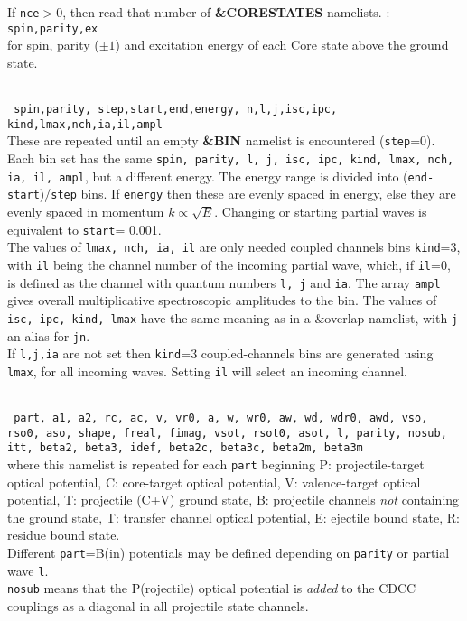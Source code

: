 \documentclass[11pt]{article}
\begin{document}
If {\tt nce}$>$0, then read that number of {\bf
\&CORESTATES} namelists. : {\tt
spin,parity,ex }\\ for spin, parity ($\pm1$) and excitation energy of each Core
state above the ground state.

\\
{\tt
spin,parity, step,start,end,energy, n,l,j,isc,ipc, kind,lmax,nch,ia,il,ampl
}\\
These are repeated until an empty  {\bf \&BIN} namelist is encountered
({\tt step}=0).\\
Each bin set has the same {\tt spin, parity, l, j, isc, ipc, kind, lmax, nch, ia,
il, ampl}, but a different energy.
The energy range is divided into ({\tt end-start})/{\tt step} bins.
If {\tt energy} then these are evenly spaced in energy, else they
are evenly spaced in momentum $k \propto \sqrt{E}$.
Changing or starting partial waves is equivalent to {\tt start}= 0.001.
\\
The values of {\tt lmax, nch, ia, il} are only needed coupled channels bins
{\tt kind}=3, with {\tt il} being the channel number of the incoming partial wave,
which, if {\tt il}=0, is defined as the channel with quantum numbers
{\tt l, j} and {\tt ia}. The array {\tt ampl} gives overall multiplicative
spectroscopic amplitudes to the bin. The values of {\tt isc, ipc, kind, lmax}
have the same meaning as in a \&overlap namelist, with {\tt j} an alias for {\tt jn}.\\
If {\tt l,j,ia} are not set then {\tt kind}=3 coupled-channels bins are generated
using {\tt lmax}, for all incoming waves. Setting {\tt il} will select an
incoming channel.

\\
{\tt
part, a1, a2, rc, ac, v, vr0, a, w, wr0, aw,
wd, wdr0, awd, vso, rso0, aso, shape, freal, fimag,
vsot, rsot0, asot, l, parity, nosub, itt,
beta2, beta3, idef, beta2c, beta3c, beta2m, beta3m
}\\
where this namelist is repeated for each {\tt part} beginning
P: projectile-target  optical potential, C: core-target optical potential,
V: valence-target  optical potential,
T: projectile (C+V) ground state,
B: projectile channels {\em not} containing the ground state,
T: transfer channel optical potential,
E: ejectile bound state, R: residue bound state.\\
Different {\tt part}=B(in) potentials may be defined depending on {\tt parity}
or partial wave {\tt l}. \\
{\tt nosub} means that the P(rojectile) optical potential is {\em added} to
the CDCC couplings as a diagonal in all projectile state channels.\\
\end{document}
